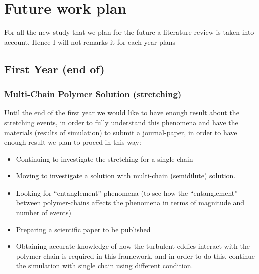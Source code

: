 \chapter{Future work plan}\label{chap_futurework}


For all the new study that we plan for the future a literature review is taken into account. Hence I will not remarks it for each year plans

\section{First Year (end of)}


\subsection{Multi-Chain Polymer Solution (stretching)}
Until the end of the first year we would like to have enough result about the stretching events, in order to fully understand this phenomena and have the materials (results of simulation) to submit a journal-paper, in order to have enough result we plan to proced in this way:

\begin{itemize}


\item Continuing to investigate the stretching for a single chain
\item Moving to investigate a solution with multi-chain (semidilute) solution.
\item Looking for ``entanglement'' phenomena (to see how the ``entanglement'' between polymer-chains affects the phenomena in terms of magnitude and number of events) 
\item Preparing a scientific paper to be published
\item Obtaining accurate knowledge of how the turbulent eddies interact with the polymer-chain is required in this framework, and in order to do this, continue the simulation with single chain using different condition. 


\end{itemize}

